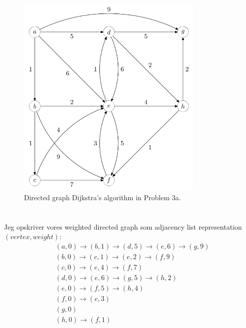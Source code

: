 \documentclass[a4paper,12pt]{article}
\begin{document}
\begin{figure}[H]
    \centering
    \includegraphics[width=0.8\textwidth]{3.png}
    \caption{Directed graph Dijkstra's algorithm in Problem 3a.}
\end{figure}
\section[Question 3]{}
\subsection[]{}

Jeg opskriver vores weighted directed graph som adjacency list representation $(vertex, weight)$:
\[
\begin{aligned}
&(a,0) \rightarrow (b,1) \rightarrow (d,5) \rightarrow (e,6) \rightarrow (g,9)\\
&(b,0) \rightarrow (c,1) \rightarrow (e,2) \rightarrow (f,9)\\
&(c,0) \rightarrow (e,4) \rightarrow (f,7)\\
&(d,0) \rightarrow (e,6) \rightarrow (g,5) \rightarrow (h,2)\\
&(e,0) \rightarrow (f,5) \rightarrow (h,4)\\
&(f,0) \rightarrow (e,3)\\
&(g,0)\\
&(h,0) \rightarrow (f,1)\\
\end{aligned}
\]
\end{document}
